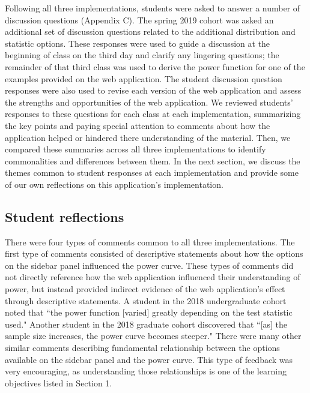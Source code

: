 \documentclass{TISE}
\begin{document}
Following all three implementations, students were asked to answer a number of discussion questions (Appendix C). The spring 2019 cohort was asked an additional set of discussion questions related to the additional distribution and statistic options. These responses were used to guide a discussion at the beginning of class on the third day and clarify any lingering questions; the remainder of that third class was used to derive the power function for one of the examples provided on the web application. The student discussion question responses were also used to revise each version of the web application and assess the strengths and opportunities of the web application. We reviewed students' responses to these questions for each class at each implementation, summarizing the key points and paying special attention to comments about how the application helped or hindered there understanding of the material. Then, we compared these summaries across all three implementations to identify commonalities and differences between them. In the next section, we discuss the themes common to student responses at each implementation and provide some of our own reflections on this application's implementation. 

\subsection{Student reflections}

There were four types of comments common to all three implementations. The first type of comments consisted of descriptive statements about how the options on the sidebar panel influenced the power curve. These types of comments did not directly reference how the web application influenced their understanding of power, but instead provided indirect evidence of the web application's effect through descriptive statements. A student in the 2018 undergraduate cohort noted that ``the power function [varied] greatly depending on the test statistic used." Another student in the 2018 graduate cohort discovered that ``[as] the sample size increases, the power curve becomes steeper." There were many other similar comments describing fundamental relationship between the options available on the sidebar panel and the power curve. This type of feedback was very encouraging, as understanding those relationships is one of the learning objectives listed in Section 1. 
\end{document}
